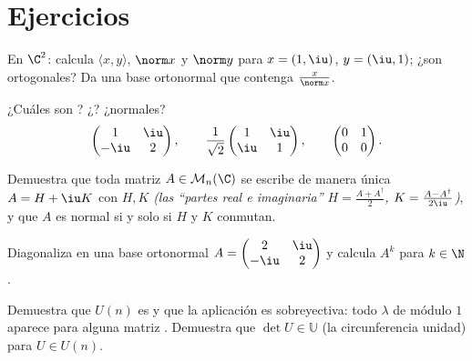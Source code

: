 \section{Ejercicios}

\begin{exercise}[$\star$]\label{exo:b2:hermitian:1}
En $\C^2$: calcula $\langle x, y\rangle$, $\norm x$ y $\norm y$ para
$x = (1, \iu)$, $y = (\iu, 1)$; ¿son ortogonales? Da una base
ortonormal que contenga $\frac{x}{\norm x}$.
\end{exercise}

\begin{exercise}[$\star$]\label{exo:b2:hermitian:2}
¿Cuáles son ? ¿? ¿normales?
\[
\begin{pmatrix} 1 & \iu\\ -\iu & 2 \end{pmatrix},
\qquad
\frac{1}{\sqrt2}\begin{pmatrix} 1 & \iu\\ \iu & 1\end{pmatrix},
\qquad
\begin{pmatrix} 0 & 1\\ 0 & 0 \end{pmatrix}.
\]
\end{exercise}

\begin{exercise}[$\star$]\label{exo:b2:hermitian:3}
Demuestra que toda matriz $A \in \mathcal{M}_n(\C)$ se escribe de
manera única $A = H + \iu K$ con $H, K$  \emph{(las
``partes real e imaginaria'' $H = \frac{A + A^\dagger}{2}$, $K =
\frac{A - A^\dagger}{2\iu}$)}, y que $A$ es normal si y solo si $H$ y
$K$ conmutan.
\end{exercise}

\begin{exercise}[$\star\star$]\label{exo:b2:hermitian:4}
Diagonaliza en una base ortonormal $A = \begin{pmatrix} 2 & \iu\\
-\iu & 2\end{pmatrix}$ y calcula $A^k$ para $k \in \N$.
\end{exercise}

\begin{exercise}[$\star\star$]\label{exo:b2:hermitian:5}
Demuestra que $U(n)$ es  y que la aplicación
 es sobreyectiva: todo $\lambda$ de módulo $1$ aparece
para alguna matriz . Demuestra que $\det U \in \mathbb{U}$
(la circunferencia unidad) para $U \in U(n)$.
\end{exercise}

